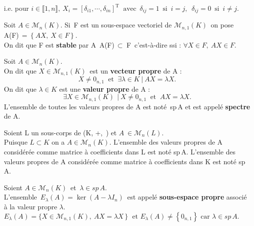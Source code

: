 \hspace{1cm}i.e. pour \(i\in \llbracket 1,n \rrbracket,\ X_i = [\delta_{i1},\cdots,\delta_{in}]^\text{T}\ \text{ avec }\, \delta _{ij}=1\,\text{ si }\,i=j,\ \; \delta_{ij}=0\,\text{ si }\,i\neq j.\) 

\vspace{1cm}

Soit \(A\in \mathcal{M}_{n}(K)\). Si\, F est un sous-espace vectoriel de \(\mathcal{M}_{n,1}(K)\,\) on pose A(F)\(\,=\left\{AX,\ X\in F\right\}\).\vspace{0.1cm}\\ 
On dit que F est \textbf{stable} par A \ssi \,A(F)$\,\subset\;$F\, c'est-à-dire ssi : \(\forall X\in F,\ AX\in F.\) 

\vspace{1.4cm}

Soit \(A\in \mathcal{M}_n(K)\).\vspace{0.1cm}\\
On dit que \(X\in \mathcal{M}_{n,1}(K)\,\) est un \textbf{vecteur propre} de A \ssi :\vspace{-0.2cm} \[X\neq 0_{n,1}\ \text{ et }\ \exists \lambda \in K \ \rvert \ AX=\lambda X.\]
On dit que \(\lambda \in K\) est une \textbf{valeur propre} de A \ssi :\vspace{-0.2cm} \[\exists X\in \mathcal{M}_{n,1}(K)\, \ \rvert \ X\neq 0_{n,1} \  \text{ et }\  AX=\lambda X.\]
L'ensemble de toutes les valeurs propres de A est noté\, sp\,A et est appelé \textbf{spectre} de A.

\vspace{1.5cm}

Soient L un sous-corps de (K, +,\, \x) et \(A\ \in \mathcal{M}_{n}(L)\).\\
Puisque \(L\subset K\) on a \(A \in \mathcal{M}_{n}(K)\). L'ensemble des valeurs propres de A considérée comme matrice à coefficients dans L est noté sp\,A. L'ensemble des valeurs propres de A considérée comme matrice à coefficients dans K est noté sp\,A.

\vspace{1.3cm}

Soient \(A\in \mathcal{M}_n(K)\,\) et \(\,\lambda \in sp\,A.\)\vspace{0.1cm}\\
L'ensemble \(\,E_\lambda(A)=\ker (A-\lambda I_n)\,\) est appelé \textbf{sous-espace propre} associé à la valeur propre $\lambda$.\vspace{0.1cm}
\(E_\lambda(A)=\{X\in \mathcal{M}_{n,1}(K),\ AX=\lambda X\,\}\; \text{ et } E_\lambda(A)\neq \left\{0_{n,1}\right\} \text{ car } \lambda\in sp\,A.\) 

